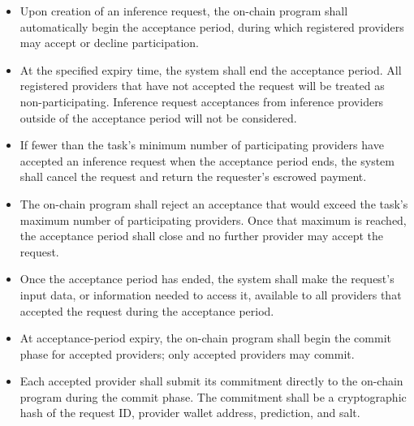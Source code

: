 \documentclass[12pt]{article}
\newcounter{reqnum} %
\begin{document}
\noindent \begin{itemize}

\item[FR\refstepcounter{reqnum}\thereqnum \label{FR_AcceptancePeriodStart}:] Upon creation of an inference request, the on-chain program shall automatically begin the acceptance period, during which registered providers may accept or decline participation.

\item[FR\refstepcounter{reqnum}\thereqnum \label{FR_AcceptancePeriodEnd}:] At the specified expiry time, the system shall end the acceptance period. All registered providers that have not accepted the request will be treated as non-participating. Inference request acceptances from inference providers outside of the acceptance period will not be considered.

\item[FR\refstepcounter{reqnum}\thereqnum \label{FR_MinimumAcceptance}:] If fewer than the task's minimum number of participating providers have accepted an inference request when the acceptance period ends, the system shall cancel the request and return the requester's escrowed payment.

\item[FR\refstepcounter{reqnum}\thereqnum \label{FR_MaximumAcceptance}:] The on-chain program shall reject an acceptance that would exceed the task's maximum number of participating providers. Once that maximum is reached, the acceptance period shall close and no further provider may accept the request.

\item[FR\refstepcounter{reqnum}\thereqnum \label{FR_RequestInputDistribution}:] Once the acceptance period has ended, the system shall make the request's input data, or information needed to access it, available to all providers that accepted the request during the acceptance period.

\item[FR\refstepcounter{reqnum}\thereqnum \label{FR_PredictionPhaseStart}:] At acceptance-period expiry, the on-chain program shall begin the commit phase for accepted providers; only accepted providers may commit.

\item[FR\refstepcounter{reqnum}\thereqnum \label{FR_PredictionSubmission}:] Each accepted provider shall submit its commitment directly to the on-chain program during the commit phase. The commitment shall be a cryptographic hash of the request ID, provider wallet address, prediction, and salt.


\end{itemize}
\end{document}
